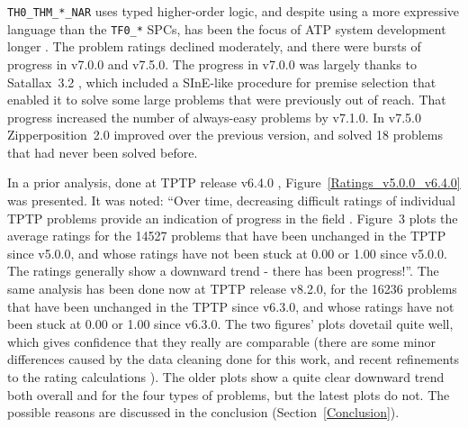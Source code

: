 \documentclass[runningheads]{llncs}
\begin{document}
{\tt TH0\_THM\_*\_NAR} uses typed higher-order logic, and despite using a more expressive
language than the {\tt TF0\_*} SPCs, has been the focus of ATP system development longer 
\cite{SB10,SS+12}.
The problem ratings declined moderately, and there were bursts of progress in v7.0.0 and v7.5.0.
The progress in v7.0.0 was largely thanks to Satallax~3.2 \cite{Bro12}, which included a SInE-like 
\cite{HV11} procedure for premise selection that enabled it to solve some large problems that 
were previously out of reach. 
That progress increased the number of always-easy problems by v7.1.0.
In v7.5.0 Zipperposition~2.0 \cite{BB+19-CADE} improved over the previous version, and solved
18 problems that had never been solved before.

In a prior analysis, done at TPTP release v6.4.0 \cite{Sut17}, Figure~\ref{Ratings_v5.0.0_v6.4.0} 
was presented. 
It was noted: ``Over time, decreasing difficult ratings of individual TPTP problems provide an 
indication of progress in the field \cite{SFS01}. Figure~3 plots the average ratings for the 
14527 problems that have been unchanged in the TPTP since v5.0.0, and whose ratings have not 
been stuck at 0.00 or 1.00 since v5.0.0. The ratings generally show a downward trend - there 
has been progress!''.
The same analysis has been done now at TPTP release v8.2.0, for the 16236 problems that have been 
unchanged in the TPTP since v6.3.0, and whose ratings have not been stuck at 0.00 or 1.00 since 
v6.3.0.
The two figures' plots dovetail quite well, which gives confidence that they really are comparable
(there are some minor differences caused by the data cleaning done for this work, and recent 
refinements to the rating calculations \cite{SD23-CASC,SD24-CASC}).
The older plots show a quite clear downward trend both overall and for the four types of problems,
but the latest plots do not.
The possible reasons are discussed in the conclusion (Section~\ref{Conclusion}).
\end{document}
